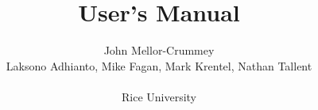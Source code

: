 \documentclass[11pt,letterpaper]{report}
\begin{document}

\title{\HPCToolkit{} User's Manual}

\author{
John Mellor-Crummey\\
Laksono Adhianto,
Mike Fagan,
Mark Krentel,
Nathan Tallent\\
\\
Rice University\\
}


\maketitle



\setcounter{page}{1}







\begin{singlespace}

\newpage

\pagestyle{empty}
\thispagestyle{empty}
\tableofcontents



\end{singlespace}
\end{document}
